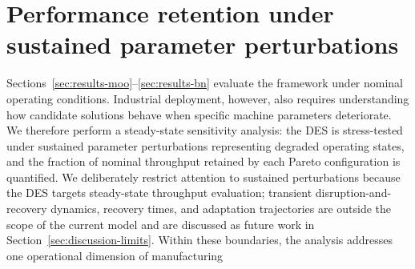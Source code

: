 \documentclass[a4paper,fleqn]{cas-sc}
\begin{document}
  \section{Performance retention under sustained parameter perturbations}\label{sec:resilience}                                             
                                                                                                                                            
  Sections~\ref{sec:results-moo}--\ref{sec:results-bn} evaluate the                                                                         
  framework under nominal operating conditions. Industrial deployment,                                                                      
  however, also requires understanding how candidate solutions behave when                                                                  
  specific machine parameters deteriorate. We therefore perform a
  steady-state sensitivity analysis: the DES is stress-tested under                                                                         
  sustained parameter perturbations representing degraded operating states,                                                                 
  and the fraction of nominal throughput retained by each Pareto                                                                            
  configuration is quantified. We deliberately restrict attention to                                                                        
  sustained perturbations because the DES targets steady-state throughput                                                                   
  evaluation; transient disruption-and-recovery dynamics, recovery times,                                                                   
  and adaptation trajectories are outside the scope of the current model                                                                    
  and are discussed as future work in                                                                                                       
  Section~\ref{sec:discussion-limits}. Within these boundaries, the                                                                         
  analysis addresses one operational dimension of manufacturing                                                                             
\end{document}
